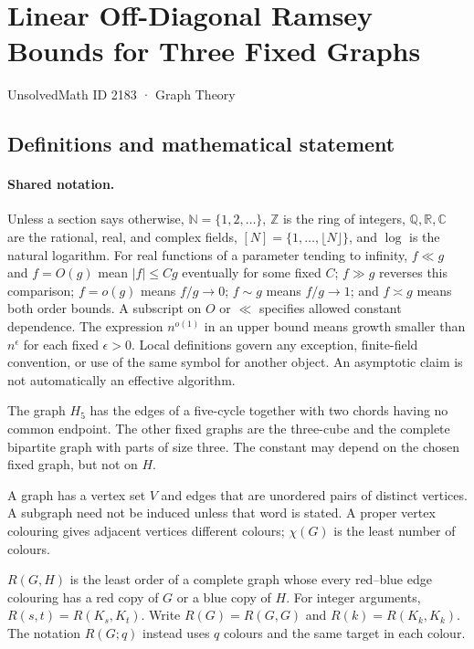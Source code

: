 \documentclass[11pt,a4paper]{article}
\newcommand{\N}{\mathbb{N}}
\newcommand{\Z}{\mathbb{Z}}
\newcommand{\Q}{\mathbb{Q}}
\newcommand{\R}{\mathbb{R}}
\newcommand{\C}{\mathbb{C}}
\begin{document}

\setcounter{section}{2182}

\section{Linear Off-Diagonal Ramsey Bounds for Three Fixed Graphs}\label{2183}

{\small\sffamily UnsolvedMath ID 2183 · Graph Theory}

\subsection{Definitions and mathematical statement}

\paragraph{Shared notation.}Unless a section says otherwise, $\N=\{1,2,\ldots\}$,
$\Z$ is the ring of integers, $\Q,\R,\C$ are the rational, real, and complex
fields, $[N]=\{1,\ldots,\lfloor N\rfloor\}$, and $\log$ is the natural
logarithm. For real functions of a parameter tending to infinity,
$f\ll g$ and $f=O(g)$ mean $|f|\leq Cg$ eventually for some fixed $C$;
$f\gg g$ reverses this comparison; $f=o(g)$ means $f/g\to0$;
$f\sim g$ means $f/g\to1$; and $f\asymp g$ means both order bounds.
A subscript on $O$ or $\ll$ specifies allowed constant dependence.
The expression $n^{o(1)}$ in an upper bound means growth smaller than
$n^\epsilon$ for each fixed $\epsilon>0$. Local definitions govern any
exception, finite-field convention, or use of the same symbol for another
object. An asymptotic claim is not automatically an effective algorithm.



The graph $H_5$ has the edges of a five-cycle together with two chords having no common endpoint. The other fixed graphs are the three-cube and the complete bipartite graph with parts of size three. The constant may depend on the chosen fixed graph, but not on $H$.

A graph has a vertex set $V$ and edges that are unordered pairs of distinct vertices. A subgraph need not be induced unless that word is stated. A proper vertex colouring gives adjacent vertices different colours; $\chi(G)$ is the least number of colours.

$R(G,H)$ is the least order of a complete graph whose every red--blue edge colouring has a red copy of $G$ or a blue copy of $H$. For integer arguments, $R(s,t)=R(K_s,K_t)$. Write $R(G)=R(G,G)$ and $R(k)=R(K_k,K_k)$. The notation $R(G;q)$ instead uses $q$ colours and the same target in each colour.
\end{document}
